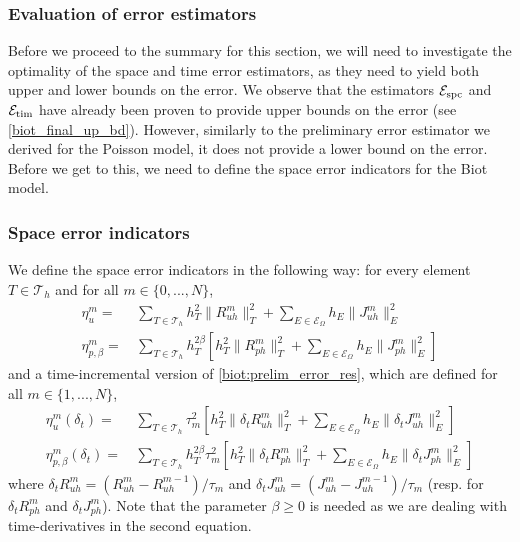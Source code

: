 \subsubsection{Evaluation of error estimators}
Before we proceed to the summary for this section, we will need to investigate the optimality of the space and time error estimators, as they need to yield both upper and lower bounds on the error. We observe that the estimators $\mathcal{E}_{\textnormal{spc}}$ and $\mathcal{E}_{\textnormal{tim}}$ have already been proven to provide upper bounds on the error (see \eqref{biot_final_up_bd}). However, similarly to the preliminary error estimator we derived for the Poisson model, it does not provide a lower bound on the error. Before we get to this, we need to define the space error indicators for the Biot model. 
\subsubsection{Space error indicators}
We define the space error indicators in the following way: for every element $T \in \mathcal{T}_h$ and for all $m \in \{0,...,N\}$,
\begin{align} \label{biot:prelim_error_res}
\eta^m_u = & \,\sum_{T \in \mathcal{T}_h} h_T^2 \|R^m_{uh}\|_T^2 + \sum_{E \in \mathcal{E}_\Omega} h_E \|J^m_{uh}\|_E^2 \\
\eta^m_{p,\beta} = & \, \sum_{T \in \mathcal{T}_h} h_T^{2\beta} [h_T^2 \|R^m_{ph}\|_T^2  + \sum_{E \in \mathcal{E}_\Omega} h_E \|J^m_{ph}\|_E^2 ]
\end{align}
and a time-incremental version of \eqref{biot:prelim_error_res}, which are defined for all $m \in \{1,...,N\}$,
\begin{align} \label{biot:prelim_error_res_time}
\eta^m_u(\delta_t) = & \,\sum_{T \in \mathcal{T}_h} \tau_m^2 [ h_T^2 \|\delta_t R^m_{uh}\|_T^2 + \sum_{E \in \mathcal{E}_\Omega} h_E \|\delta_t J^m_{uh}\|_E^2 ] \\ 
\eta^m_{p,\beta}(\delta_t) = & \, \sum_{T \in \mathcal{T}_h} h_T^{2\beta} \tau_m^2 [h_T^2 \|\delta_t R^m_{ph}\|_T^2  + \sum_{E \in \mathcal{E}_\Omega} h_E \|\delta_t J^m_{ph}\|_E^2 ] \label{biot:prelim_error_res_time2}
\end{align}
where $\delta_t R^m_{uh} = (R_{uh}^m - R_{uh}^{m-1})/\tau_m$ and $\delta_t J^m_{uh} = (J_{uh}^m - J_{uh}^{m-1})/\tau_m$ (resp. for $\delta_t R^m_{ph}$ and $\delta_t J^m_{ph}$). Note that the parameter $\beta \geq 0$ is needed as we are dealing with time-derivatives in the second equation.
\\
